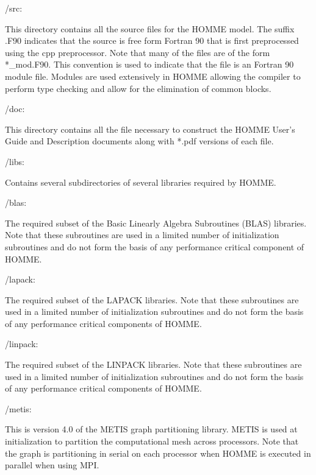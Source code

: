 \documentclass[12pt]{article}
\numberwithin{equation}{section}
\begin{document}
\begin{list}
{\setlength{\rightmargin}{\leftmargin}}
\item  /src:  

	This directory contains all the source files for the HOMME model.  The suffix .F90 indicates that the source is free form Fortran 90 that is first preprocessed using the cpp preprocessor.  Note that many of the files are of the form *\_mod.F90.  This convention is used to indicate that the file is an Fortran 90 module file.  Modules are used extensively in HOMME allowing the compiler to perform type checking and allow for the elimination of common blocks.
	
\item /doc:
	
	This directory contains all the file necessary to construct the HOMME User's Guide and Description documents along with *.pdf versions of each file.
	
\item /libs:

	Contains several subdirectories of several libraries required by HOMME.  
	\begin{list} {\setlength{\rightmargin}{\leftmargin}}
		\item /blas:
			
			The required subset of the Basic Linearly Algebra Subroutines (BLAS) libraries. Note that these subroutines are used in a limited number of initialization subroutines  and do not form the basis of any performance critical component of HOMME.  
			
		\item /lapack:
			
			The required subset of the LAPACK libraries.  Note that these subroutines are used in a limited number of initialization subroutines and do not form the basis of any performance critical components of HOMME. 
			
		\item /linpack:
			
			The required subset of the LINPACK libraries.  Note that these subroutines are used in a limited number of initialization subroutines and do not form the basis of any performance critical components of HOMME.
			
		\item /metis:
		
			This is version 4.0 of the METIS graph partitioning library.  METIS is used at initialization to partition the computational mesh across processors.  Note that the graph is partitioning in serial on each processor when HOMME is executed in parallel when using MPI.
			

\end{list}
\end{list}
\end{document}
